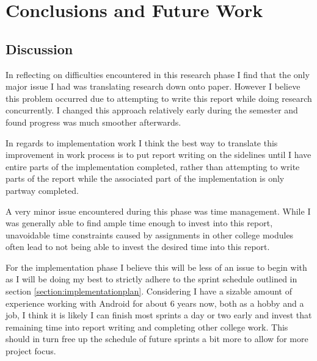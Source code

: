 \chapter{Conclusions and Future Work}
\label{chap:conclusions}

\section{Discussion}
\label{section:discussion}

In reflecting on difficulties encountered in this research phase I find that the only major issue I had was translating research down onto paper. However I believe this problem occurred due to attempting to write this report while doing research concurrently. I changed this approach relatively early during the semester and found progress was much smoother afterwards. 

In regards to implementation work I think the best way to translate this improvement in work process is to put report writing on the sidelines until I have entire parts of the implementation completed, rather than attempting to write parts of the report while the associated part of the implementation is only partway completed.

A very minor issue encountered during this phase was time management. While I was generally able to find ample time enough to invest into this report, unavoidable time constraints caused by assignments in other college modules often lead to not being able to invest the desired time into this report.

For the implementation phase I believe this will be less of an issue to begin with as I will be doing my best to strictly adhere to the sprint schedule outlined in section \ref{section:implementationplan}. Considering I have a sizable amount of experience working with Android for about 6 years now, both as a hobby and a job, I think it is likely I can finish most sprints a day or two early and invest that remaining time into report writing and completing other college work. This should in turn free up the schedule of future sprints a bit more to allow for more project focus.

